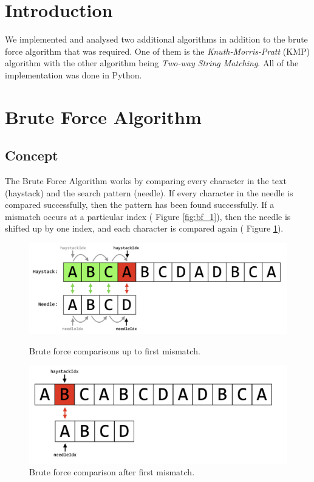 
\section*{Introduction}

We implemented and analysed two additional algorithms in addition to the brute force algorithm that was required. One of them is the \emph{Knuth-Morris-Pratt} (KMP) algorithm with the other algorithm being \emph{Two-way String Matching}. All of the implementation was done in Python.

\section*{Brute Force Algorithm}

\subsection*{Concept}
The Brute Force Algorithm works by comparing every character in the text (haystack) and the search pattern (needle). If every character in the needle is compared successfully, then the pattern has been found successfully. If a mismatch occurs at a particular index ( Figure \ref{fig:bf_1}), then the needle is shifted up by one index, and each character is compared again ( Figure \ref{fig:bf_2}). 

\begin{figure}[H]
  \centering
  \begin{minipage}[b]{0.4\textwidth}
    \includegraphics[width=\textwidth]{images/brute_force_1.png}
    \caption{Brute force comparisons up to first mismatch.}
    \label{fig:bf_1}
  \end{minipage}
  \hfill
  \begin{minipage}[b]{0.4\textwidth}
    \includegraphics[width=\textwidth]{images/brute_force_2.png}
    \caption{Brute force comparison after first mismatch.}
    \label{fig:bf_2}
  \end{minipage}
\end{figure}


